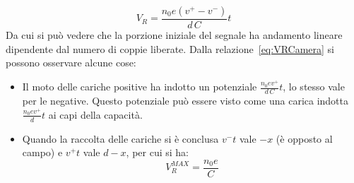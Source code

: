 \begin{equation}\label{eq:VRCamera}
V_R = \frac{n_0 e (v^+-v^-)}{d\,C}t
\end{equation}
Da cui si pu\`o vedere che la porzione iniziale del segnale ha andamento lineare dipendente dal numero di coppie liberate.
Dalla relazione~\ref{eq:VRCamera} si possono osservare alcune cose:
\begin{itemize}
\item Il moto delle cariche positive ha indotto un potenziale $\frac{n_0 e v^+}{d\,C}t$, lo stesso vale per le negative. 
Questo potenziale pu\`o essere visto come una carica indotta $\frac{n_0 e v^+}{d}t$ ai capi della capacit\`a.
\item Quando la raccolta delle cariche si \`e conclusa $v^- t$ vale $-x$ (\`e opposto al campo) e $v^+ t$ vale $d-x$, per cui si ha:
\begin{equation*}
V_R^{MAX} = \frac{n_0 e}{C}
\end{equation*}
\end{itemize}
